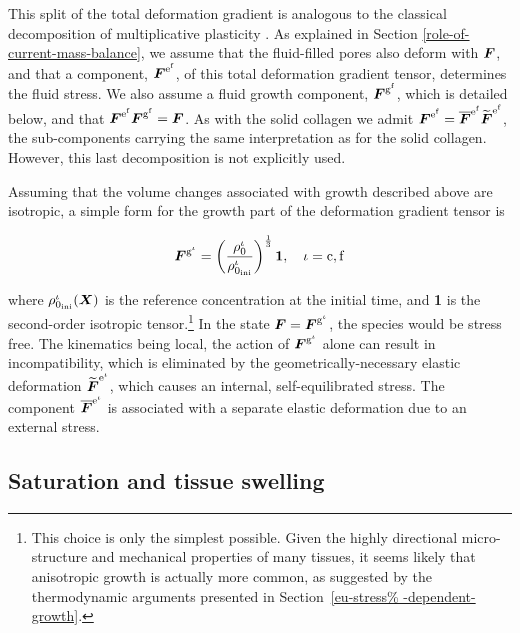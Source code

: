 This split of the total deformation gradient is analogous to the
classical decomposition of multiplicative plasticity
\citep{Bilbyetal:1956,Lee:1969}. As explained in Section
\ref{role-of-current-mass-balance}, we assume that the fluid-filled
pores also deform with $\mbox{\boldmath$ F$}$, and that a component,
$\mbox{\boldmath$ F$}^{\mathrm{e}^\mathrm{f}}$, of this total deformation gradient
tensor, determines the fluid stress. We also assume a fluid growth
component, $\mbox{\boldmath$ F$}^{\mathrm{g}^\mathrm{f}}$, which is detailed below, and
that $\mbox{\boldmath$ F$}^{\mathrm{e}^\mathrm{f}}\mbox{\boldmath$ F$}^{\mathrm{g}^\mathrm{f}} =
\mbox{\boldmath$ F$}$. As with the solid collagen we admit $\mbox{\boldmath$ F$}^{\mathrm{e}^\mathrm{f}}
= \overline{\mbox{\boldmath$ F$}}^{\mathrm{e}^\mathrm{f}}
\widetilde{\mbox{\boldmath$ F$}}^{\mathrm{e}^\mathrm{f}}$, the sub-components carrying
the same interpretation as for the solid collagen. However, this last
decomposition is not explicitly used.

Assuming that the volume changes associated with growth described
above are isotropic, a simple form for the growth part of the
deformation gradient tensor is

\begin{equation}
\mbox{\boldmath$ F$}^{\mathrm{g}^\iota} = \left(
\frac{\rho_0^\iota}{\rho_{0_{\mathrm{ini}}}^\iota} \right)^
     {\frac{1}{3}} {\bf 1},\quad \iota = \mathrm{c,f}
\label{isotropicgrowth} 
\end{equation} 

\noindent where $\rho_{0_{\mathrm{ini}}}^\iota(\mbox{\boldmath$ X$})$ is the reference
concentration at the initial time, and {\bf 1} is the second-order
isotropic tensor.\footnote{This choice is only the simplest
  possible. Given the highly directional micro-structure and
  mechanical properties of many tissues, it seems likely that
  anisotropic growth is actually more common, as suggested by the
  thermodynamic arguments presented in Section~\ref{eu-stress%
    -dependent-growth}.} In the state $\mbox{\boldmath$ F$} = \mbox{\boldmath$ F$}^{\mathrm{g}^\iota}$,
the species would be stress free. The kinematics being local, the
action of $\mbox{\boldmath$ F$}^{\mathrm{g}^\iota}$ alone can result in
incompatibility, which is eliminated by the geometrically-necessary
elastic deformation $\widetilde{\mbox{\boldmath$ F$}}^{\mathrm{e}^{\mathrm{\iota}}}$,
which causes an internal, self-equilibrated stress. The component
$\overline{\mbox{\boldmath$ F$}}^{\mathrm{e}^\iota}$ is associated with a separate
elastic deformation due to an external stress.

\subsection{Saturation and tissue swelling}
\label{saturation-and-tissue-swelling}

